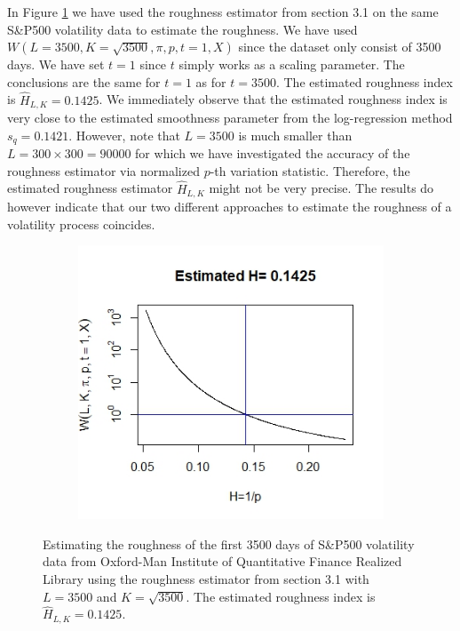 \documentclass{article}
\begin{document}
In Figure \ref{fig:oxfordw} we have used the roughness estimator from section 3.1 on the same S\&P500 volatility data to estimate the roughness. We have used $W(L = 3500, K = \sqrt{3500}, \pi, p, t=1, X)$ since the dataset only consist of 3500 days. We have set $t=1$ since $t$ simply works as a scaling parameter. The conclusions are the same for $t=1$ as for $t=3500$. The estimated roughness index is $\hat{H}_{L,K}=0.1425$. We immediately observe that the estimated roughness index is very close to the estimated smoothness parameter from the log-regression method $s_q=0.1421$. However, note that $L=3500$ is much smaller than $L=300\times 300 = 90000$ for which we have investigated the accuracy of the roughness estimator via normalized $p$-th variation statistic. Therefore, the estimated roughness estimator $\hat{H}_{L,K}$ might not be very precise. The results do however indicate that our two different approaches to estimate the roughness of a volatility process coincides.
\begin{figure}[htbp]
    \centering
    
    \begin{subfigure}{0.78\textwidth}
        \includegraphics[width=\linewidth]{volisW.jpeg}
    \end{subfigure}
    
    \caption{Estimating the roughness of the first 3500 days of S\&P500 volatility data from Oxford-Man Institute of Quantitative Finance Realized Library using the roughness estimator from section 3.1 with $L=3500$ and $K=\sqrt{3500}$. The estimated roughness index is $\hat{H}_{L,K}=0.1425$.}
    \label{fig:oxfordw}
\end{figure}\\
\end{document}
